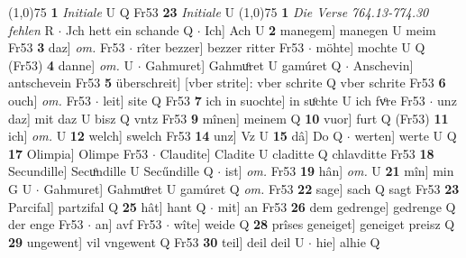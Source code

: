 \documentclass[8pt,a4paper,notitlepage]{article}
\begin{document}
\begin{table}[ht]
\begin{minipage}[t]{0.5\linewidth}
\line(1,0){75} \newline
\textbf{1} \textit{Initiale} U Q Fr53  \textbf{23} \textit{Initiale} U  \newline
\line(1,0){75} \newline
\textbf{1} \textit{Die Verse 764.13-774.30 fehlen} R   $\cdot$ Jch hett ein schande Q  $\cdot$ Ich] Ach U \textbf{2} manegem] manegen U meim Fr53 \textbf{3} daz] \textit{om.} Fr53  $\cdot$ rîter bezzer] bezzer ritter Fr53  $\cdot$ möhte] mochte U Q (Fr53) \textbf{4} danne] \textit{om.} U  $\cdot$ Gahmuret] Gahmuͦret U gamúret Q  $\cdot$ Anschevin] antschevein Fr53 \textbf{5} überschreit] [vber strite]: vber schrite Q vber schrite Fr53 \textbf{6} ouch] \textit{om.} Fr53  $\cdot$ leit] site Q Fr53 \textbf{7} ich in suochte] in suͦchte U ich fvͦre Fr53  $\cdot$ unz daz] mit daz U bisz Q vntz Fr53 \textbf{9} mînen] meinem Q \textbf{10} vuor] furt Q (Fr53) \textbf{11} ich] \textit{om.} U \textbf{12} welch] swelch Fr53 \textbf{14} unz] Vz U \textbf{15} dâ] Do Q  $\cdot$ werten] werte U Q \textbf{17} Olimpia] Olimpe Fr53  $\cdot$ Claudite] Cladite U claditte Q chlavditte Fr53 \textbf{18} Secundille] Secuͦndille U Secűndille Q  $\cdot$ ist] \textit{om.} Fr53 \textbf{19} hân] \textit{om.} U \textbf{21} mîn] min G U  $\cdot$ Gahmuret] Gahmuͦret U gamúret Q \textit{om.} Fr53 \textbf{22} sage] sach Q sagt Fr53 \textbf{23} Parcifal] partzifal Q \textbf{25} hât] hant Q  $\cdot$ mit] an Fr53 \textbf{26} dem gedrenge] gedrenge Q der enge Fr53  $\cdot$ an] avf Fr53  $\cdot$ wîte] weide Q \textbf{28} prîses geneiget] geneiget preisz Q \textbf{29} ungewent] vil vngewent Q Fr53 \textbf{30} teil] deil deil U  $\cdot$ hie] alhie Q \newline
\end{minipage}
\end{table}
\end{document}
